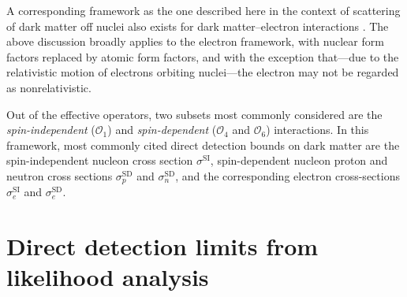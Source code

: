 \documentclass[b5paper, 10pt, twoside]{book}
\begin{document}
A corresponding framework as the one described here in the context of scattering of dark matter off nuclei also exists for dark matter--electron interactions \parencites{CatenaEtAl2020, CatenaEtAl2021}. The above discussion broadly applies to the electron framework, with nuclear form factors replaced by atomic form factors, and with the exception that---due to the relativistic motion of electrons orbiting nuclei---the electron may not be regarded as nonrelativistic.

Out of the effective operators, two subsets most commonly considered are the \emph{spin-independent} ($\mathcal{O_1}$) and \emph{spin-dependent} ($\mathcal{O}_4$ and $\mathcal{O}_6$) interactions. In this framework, most commonly cited direct detection bounds on dark matter are the spin-independent nucleon cross section $\sigma^\text{SI}$, spin-dependent nucleon proton and neutron cross sections $\sigma_p^\text{SD}$ and $\sigma_n^\text{SD}$, and the corresponding electron cross-sections $\sigma_e^\text{SI}$ and $\sigma_e^\text{SD}$.

\section{Direct detection limits from likelihood analysis}
\end{document}

